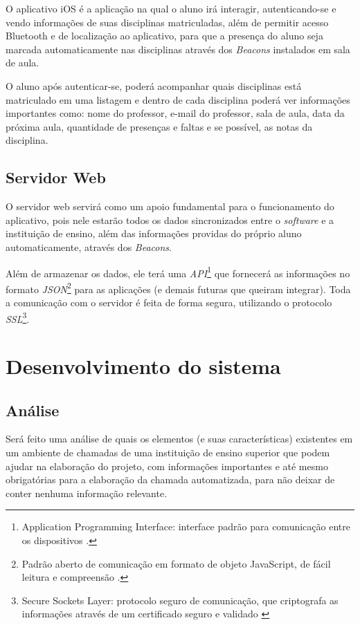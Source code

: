 \documentclass[
	12pt,
	oneside,
	a4paper,
	english,
	brazil,
]{abntex2}
\begin{document}
O aplicativo iOS é a aplicação na qual o aluno irá interagir, autenticando-se e vendo informações de suas disciplinas matriculadas, além de permitir acesso Bluetooth e de localização ao aplicativo, para que a presença do aluno seja marcada automaticamente nas disciplinas através dos \emph{Beacons} instalados em sala de aula.

O aluno após autenticar-se, poderá acompanhar quais disciplinas está matriculado em uma listagem e dentro de cada disciplina poderá ver informações importantes como: nome do professor, e-mail do professor, sala de aula, data da próxima aula, quantidade de presenças e faltas e se possível, as notas da disciplina.

\subsection{Servidor Web}

O servidor web servirá como um apoio fundamental para o funcionamento do aplicativo, pois nele estarão todos os dados sincronizados entre o \emph{software} e a instituição de ensino, além das informações providas do próprio aluno automaticamente, através dos \emph{Beacons}.

Além de armazenar os dados, ele terá uma \emph{API}\footnote{Application Programming Interface: interface padrão para comunicação entre os dispositivos \cite{footnote-api}.} que fornecerá as informações no formato \emph{JSON}\footnote{Padrão aberto de comunicação em formato de objeto JavaScript, de fácil leitura e compreensão \cite{footnote-json}.} para as aplicações (e demais futuras que queiram integrar). Toda a comunicação com o servidor é feita de forma segura, utilizando o protocolo \emph{SSL}\footnote{Secure Sockets Layer: protocolo seguro de comunicação, que criptografa as informações através de um certificado seguro e validado \cite{footnote-ssl}}. 

\section{Desenvolvimento do sistema}
\subsection{Análise}

Será feito uma análise de quais os elementos (e suas características) existentes em um ambiente de chamadas de uma instituição de ensino superior que podem ajudar na elaboração do projeto, com informações importantes e até mesmo obrigatórias para a elaboração da chamada automatizada, para não deixar de conter nenhuma informação relevante.
\end{document}

